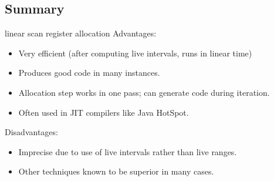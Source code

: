 \subsection{Summary}

linear scan register allocation Advantages:

\begin{itemize}
	\item Very efficient (after computing live intervals, runs in linear
	      time)
	\item Produces good code in many instances.
	\item Allocation step works in one pass; can generate code during
	      iteration.
	\item Often used in JIT compilers like Java HotSpot.
\end{itemize}
Disadvantages:
\begin{itemize}
	\item Imprecise due to use of live intervals rather than live ranges.
	\item Other techniques known to be superior in many cases.
\end{itemize}